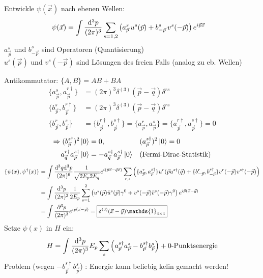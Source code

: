 Entwickle $\psi(\vec{x})$ nach ebenen Wellen:
	\begin{align*}
		\psi (\vec{x}) &= 
		\int \frac{\mathrm{d}^3 p}{(2 \pi)^3} \sum_{s=1,2} 
		\left(
			a_{\vec{p}}^s \,u^s(\vec{p}) + b_{-\vec{p}}^s\, v^s(-\vec{p})
		\right) e^{i\vec{p} \vec{x}}
	\end{align*}
$a_{\vec{p}}^s$ und $b_{-\vec{p}}^s$ sind Operatoren (Quantisierung) 
\\
$u^s(\vec{p})$ und $v^s(-\vec{p})$ sind Lösungen des freien Falls (analog zu eb. Wellen)

Antikommutator: $\{A, B\} = AB + BA$
	\begin{align*}
		\{a_{\vec{p}}^s, a_{\vec{p}}^{r \dagger} \} &= 
		(2 \pi)^3 \delta^{(3)} (\vec{p} - \vec{q}) \delta^{rs} \\
		\{b_{\vec{p}}^s, b_{\vec{p}}^{r \dagger} \} &= 
		(2 \pi)^3 \delta^{(3)} (\vec{p} - \vec{q}) \delta^{rs} \\
		\{b_{\vec{p}}^r, b_{\vec{p}}^{s} \} &= 
		\{b_{\vec{p}}^{r\dagger}, b_{\vec{p}}^{s\dagger} \} 
		= \{a_{\vec{p}}^r, a_{\vec{p}}^{s} \}
		= \{a_{\vec{p}}^{r\dagger}, a_{\vec{p}}^{s\dagger} \} = 0
	\end{align*}
	\begin{align*}
		\Rightarrow (b_{\vec{p}}^{s\dagger})^2 \ket{0} &= 0,&
		&(a_{\vec{p}}^{s\dagger})^2 \ket{0} = 0 \\
		a_{\vec{q}}^{r\dagger} a_{\vec{p}}^{s\dagger} \ket{0} &= 
		- a_{\vec{q}}^{s\dagger} a_{\vec{p}}^{s\dagger} \ket{0}
		& &(\text{Fermi-Dirac-Statistik})
	\end{align*}
	\begin{align*}
		\{\psi(x), \psi^\dagger(x)\} &= 
		\int\frac{\diff^3 q \diff^3 p}{(2\pi)^6} 
		\frac{1}{\sqrt{2 E_p 2 E_q}} e^{i(\vec{p} \vec{x} - \vec{q} \vec{x})} 
		\sum_{r,s} 
		\left(
			\{a_{\vec{p}}^{r}, a_{\vec{p}}^{s\dagger}\} u^r(\vec{p} u^{s\dagger} (\vec{q}) 
			+ \{b_{-\vec{p}}^{r}, b_{-\vec{p}}^{s\dagger}\} v^r(-\vec{p}) v^{s\dagger} (-\vec{p})
		\right) \\
		&= \int \frac{\diff^3 p}{(2\pi)^3} \frac{1}{2 E_p} \sum_{s = 1}^{2} 
		\left(
			u^s(\vec{p}) \bar{u}^s(\vec{p}) \gamma^0 + v^s(-\vec{p}) \bar{v}^s (-\vec{p}) \gamma^0
		\right) e^{i \vec{p}(\vec{x}- \vec{y})} \\
		&= \int \frac{\partial^3 p}{(2\pi)^3} e^{i\vec{p}(\vec{x}- \vec{y})} = 
		\boxed{\delta^{(3)}(\vec{x} - \vec{y}) \mathds{1}_{4 \times 4}}
	\end{align*}
Setze $\psi(x)$ in $H$ ein:
	\begin{align*}
		H = \int \frac{\mathrm{d}^3 p}{(2\pi)^3} E_p \sum_s 
		\left(
			a_{\vec{p}}^{s\dagger} a_{\vec{p}}^{s} - b_{\vec{p}}^{s\dagger} b_{\vec{p}}^{s} 
		\right) + \text{0-Punktsenergie}
	\end{align*}
Problem (wegen $- b_{\vec{p}}^{s\dagger} b_{\vec{p}}^{s}$) : Energie kann beliebig kelin gemacht werden!

